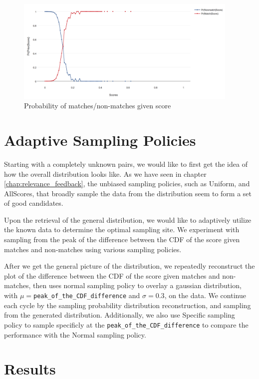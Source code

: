 \begin{figure}[h]
  \centering
  \includegraphics[width=0.95\textwidth]{dataset/otago/pms}
  \caption{Probability of matches/non-matches given score}
  \label{fig:pms_grand}
\end{figure}

\section{Adaptive Sampling Policies} %
\label{sec:sampling_policies}

Starting with a completely unknown pairs, we would like to first get the idea
of how the overall distribution looks like. As we have seen in chapter
\ref{chap:relevance_feedback}, the unbiased sampling policies, such as Uniform,
and AllScores, that broadly sample the data from the distribution seem to form
a set of good candidates.

Upon the retrieval of the general distribution, we would like to adaptively
utilize the known data to determine the optimal sampling site. We experiment
with sampling from the peak of the difference between the CDF of the score
given matches and non-matches using various sampling policies.

After we get the general picture of the distribution, we repeatedly reconstruct
the plot of the difference between the CDF of the score given matches and
non-matches, then uses normal sampling policy to overlay a gaussian
distribution, with $\mu=$\texttt{peak\_of\_the\_CDF\_difference} and
$\sigma=0.3$, on the data. We continue each cycle by the sampling probability
distribution reconstruction, and sampling from the generated distribution.
Additionally, we also use Specific sampling policy to sample specificly at the
\texttt{peak\_of\_the\_CDF\_difference} to compare the performance with the
Normal sampling policy.

\section{Results}


